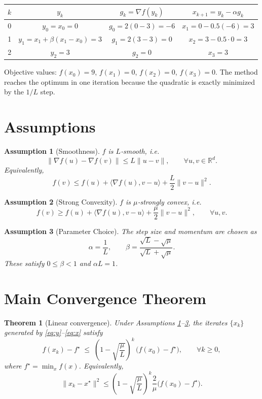 \documentclass{article}
\newtheorem{theorem}{Theorem}
\newtheorem{assumption}{Assumption}
\newcommand{\grad}{\nabla}
\begin{document}
\begin{tabular}{c|c|c|c}
$k$ & $y_k$ & $g_k=\grad f(y_k)$ & $x_{k+1}=y_k-\alpha g_k$ \\ \hline
0 & $y_0 = x_0 =0$ & $g_0 = 2(0-3) = -6$ & $x_1 =0-0.5(-6)=3$ \\
1 & $y_1 = x_1 +\beta(x_1-x_0)=3$ & $g_1 = 2(3-3)=0$ & $x_2 =3-0.5\cdot0=3$ \\
2 & $y_2 =3$ & $g_2 =0$ & $x_3 =3$ 
\end{tabular}

Objective values: $f(x_0)=9$, $f(x_1)=0$, $f(x_2)=0$, $f(x_3)=0$.  
The method reaches the optimum in one iteration because the quadratic is exactly minimized by the $1/L$ step.

\newpage
\section*{Assumptions}
\begin{assumption}[Smoothness]\label{as:smooth}
$f$ is $L$‑smooth, i.e.
\[
\|\grad f(u)-\grad f(v)\|\le L\|u-v\|,\qquad\forall u,v\in\mathbb{R}^d .
\]
Equivalently,
\[
f(v)\le f(u)+\langle\grad f(u),v-u\rangle+\frac{L}{2}\|v-u\|^2 .
\]
\end{assumption}
\begin{assumption}[Strong Convexity]\label{as:strong}
$f$ is $\mu$‑strongly convex, i.e.
\[
f(v)\ge f(u)+\langle\grad f(u),v-u\rangle+\frac{\mu}{2}\|v-u\|^2 ,\qquad\forall u,v .
\]
\end{assumption}
\begin{assumption}[Parameter Choice]\label{as:param}
The step size and momentum are chosen as
\[
\alpha=\frac{1}{L},\qquad 
\beta=\frac{\sqrt{L}-\sqrt{\mu}}{\sqrt{L}+\sqrt{\mu}} .
\]
These satisfy $0\le\beta<1$ and $\alpha L=1$.
\end{assumption}

\section*{Main Convergence Theorem}
\begin{theorem}[Linear convergence]\label{thm:linear}
Under Assumptions \ref{as:smooth}–\ref{as:param}, the iterates $\{x_k\}$ generated by \eqref{eq:y}–\eqref{eq:x} satisfy
\[
f(x_k)-f^\star \;\le\;
\left(1-\sqrt{\frac{\mu}{L}}\right)^{k}\,
\bigl(f(x_0)-f^\star\bigr),
\qquad\forall k\ge 0,
\]
where $f^\star=\min_x f(x)$.  
Equivalently,
\[
\|x_k-x^\star\|^2\le
\left(1-\sqrt{\frac{\mu}{L}}\right)^{k}
\frac{2}{\mu}\bigl(f(x_0)-f^\star\bigr).
\]
\end{theorem}
\end{document}
